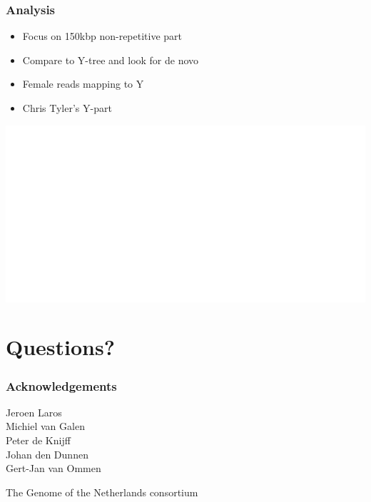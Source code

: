 \documentclass[slidestop,14pt]{beamer}
\begin{document}
\begin{frame}
  \frametitle{Analysis}

  \vspace{0.5\baselineskip}

  \begin{itemize}
    \item Focus on 150kbp non-repetitive part
    \item Compare to Y-tree and look for de novo
    \item<2-> Female reads mapping to Y
    \item<2-> Chris Tyler's Y-part
 \end{itemize}

  \vspace{-\baselineskip}

  \begin{center}
    \includegraphics[width=0.8\linewidth,transparent]{yhaplogroups.png}
  \end{center}

\end{frame}

\section{Questions?}


\lastpagetemplate
\begin{frame}
  \frametitle{Acknowledgements}

  \vspace{\baselineskip}

  Jeroen Laros\\
  Michiel van Galen\\
  Peter de Knijff\\
  Johan den Dunnen\\
  Gert-Jan van Ommen

  \vspace{\baselineskip}

  The Genome of the Netherlands consortium
\end{frame}
\end{document}
